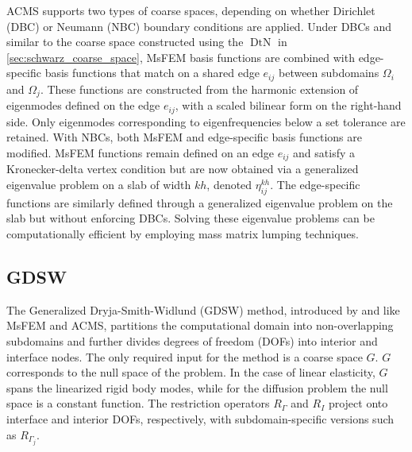 ACMS supports two types of coarse spaces, depending on whether Dirichlet (DBC) or Neumann (NBC) boundary conditions are applied. Under DBCs and similar to the coarse space constructed using the $\operatorname{DtN}$ in \cref{sec:schwarz_coarse_space}, MsFEM basis functions are combined with edge-specific basis functions that match on a shared edge $e_{ij}$ between subdomains $\Omega_i$ and $\Omega_j$. These functions are constructed from the harmonic extension of eigenmodes defined on the edge $e_{ij}$, with a scaled bilinear form on the right-hand side. Only eigenmodes corresponding to eigenfrequencies below a set tolerance are retained. With NBCs, both MsFEM and edge-specific basis functions are modified. MsFEM functions remain defined on an edge $e_{ij}$ and satisfy a Kronecker-delta vertex condition but are now obtained via a generalized eigenvalue problem on a slab of width $kh$, denoted $\eta^{kh}_{ij}$. The edge-specific functions are similarly defined through a generalized eigenvalue problem on the slab but without enforcing DBCs. Solving these eigenvalue problems can be computationally efficient by employing mass matrix lumping techniques.

\subsection{GDSW}
The Generalized Dryja-Smith-Widlund (GDSW) method, introduced by \cite{gdsw_coarse_space_Dohrmann2008} and like MsFEM and ACMS, partitions the computational domain into non-overlapping subdomains and further divides degrees of freedom (DOFs) into interior and interface nodes. The only required input for the method is a coarse space $G$. $G$ corresponds to the null space of the problem. In the case of linear elasticity, $G$ spans the linearized rigid body modes, while for the diffusion problem the null space is a constant function. The restriction operators $R_{\Gamma}$ and $R_I$ project onto interface and interior DOFs, respectively, with subdomain-specific versions such as $R_{\Gamma_j}$.

